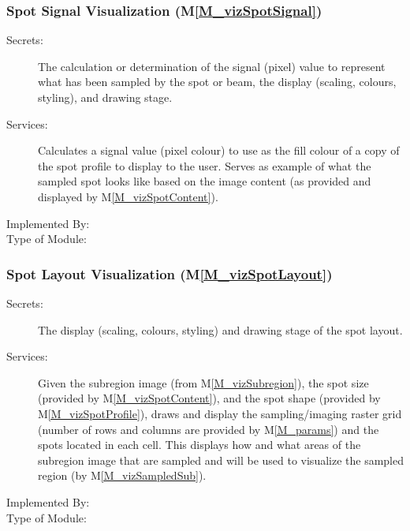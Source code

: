 \documentclass[12pt, titlepage]{article}
\newcommand{\mref}[1]{M\ref{#1}}
\begin{document}
\subsubsection{Spot Signal Visualization (\mref{M_vizSpotSignal})}
\begin{description}
\item[Secrets:]The calculation or determination of the signal (pixel) value to represent
  what has been sampled by the spot or beam, the display (scaling, colours, styling),
  and drawing stage.
\item[Services:]Calculates a signal value (pixel colour) to use as the fill colour
  of a copy of the spot profile to display to the user.
  Serves as example of what the sampled spot looks like based on the image content
  (as provided and displayed by \mref{M_vizSpotContent}).
\item[Implemented By:] \progname{}
\item[Type of Module:] 
\end{description}


\subsubsection{Spot Layout Visualization (\mref{M_vizSpotLayout})}
\begin{description}
\item[Secrets:]The display (scaling, colours, styling) and drawing stage of the spot layout.
\item[Services:]Given the subregion image (from \mref{M_vizSubregion}), 
  the spot size (provided by \mref{M_vizSpotContent}),
  and the spot shape (provided by \mref{M_vizSpotProfile}),
  draws and display the sampling/imaging raster grid
  (number of rows and columns are provided by \mref{M_params}) and
  the spots located in each cell. This displays how and what areas of the subregion
  image that are sampled and will be used to visualize the 
  sampled region (by \mref{M_vizSampledSub}).
\item[Implemented By:] \progname{}
\item[Type of Module:] 
\end{description}
\end{document}
